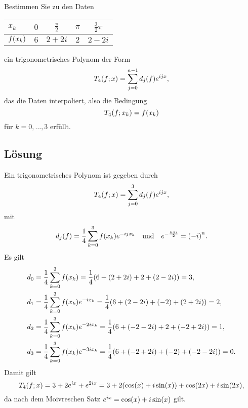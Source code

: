 \documentclass{exercise}
\begin{document}
    \begin{problem}
        Bestimmen Sie zu den Daten
        \begin{center}
            \begin{tabular}{lcccc}
                \toprule
                \(x_k\) & \(0\) & \(\frac{\pi}{2}\) & \(\pi\) & \(\frac{3}{2}\pi\)\\
                \midrule
                \(f\parentheses*{x_k}\) & \(6\) & \(2 + 2i\) & \(2\) & \(2 - 2i\)\\
                \bottomrule
            \end{tabular}
        \end{center}
        ein trigonometrisches Polynom der Form
        \[
            T_4\parentheses*{f; x} = \sum_{j = 0}^{n - 1}d_j\parentheses*{f}e^{ijx},
        \]
        das die Daten interpoliert, also die Bedingung
        \[
            T_4\parentheses*{f; x_k} = f\parentheses*{x_k}
        \]
        für \(k = 0, \ldots, 3\) erfüllt.
    \end{problem}
    
    \subsection*{Lösung}
    Ein trigonometrisches Polynom ist gegeben durch
    \[
        T_4\parentheses*{f; x} = \sum_{j = 0}^3 d_j\parentheses*{f}e^{ijx},
    \]
    mit
    \[
        d_j\parentheses*{f} = \frac{1}{4}\sum_{k = 0}^3 f\parentheses*{x_k}e^{-ijx_k} \quad \text{und} \quad e^{-\frac{h\pi i}{2}} = \parentheses*{-i}^n.
    \]
    Es gilt
    \begin{align*}
        d_0 &= \frac{1}{4}\sum_{k = 0}^3 f\parentheses*{x_k} = \frac{1}{4}\parentheses*{6 + \parentheses*{2 + 2i} + 2 + \parentheses*{2 - 2i}} = 3,\\
        d_1 &= \frac{1}{4}\sum_{k = 0}^3 f\parentheses*{x_k}e^{-ix_k} = \frac{1}{4}\parentheses*{6 + \parentheses*{2 - 2i} + \parentheses*{-2} + \parentheses*{2 + 2i}} = 2,\\
        d_2 &= \frac{1}{4}\sum_{k = 0}^3 f\parentheses*{x_k}e^{-2ix_k} = \frac{1}{4}\parentheses*{6 + \parentheses*{-2 - 2i} + 2 + \parentheses*{-2 + 2i}} = 1,\\
        d_3 &= \frac{1}{4}\sum_{k = 0}^3 f\parentheses*{x_k}e^{-3ix_k} = \frac{1}{4}\parentheses*{6 + \parentheses*{-2 + 2i} + \parentheses*{-2} + \parentheses*{-2 - 2i}} = 0.
    \end{align*}
    Damit gilt
    \[
        T_4\parentheses*{f; x} = 3 + 2e^{ix} + e^{2ix} = 3 + 2\parentheses*{\cos\parentheses*{x} + i\sin\parentheses*{x}} + \cos\parentheses*{2x} + i\sin\parentheses*{2x},
    \]
    da nach dem Moivreschen Satz \(e^{ix} = \cos\parentheses*{x} + i\sin\parentheses*{x}\) gilt.
\end{document}
